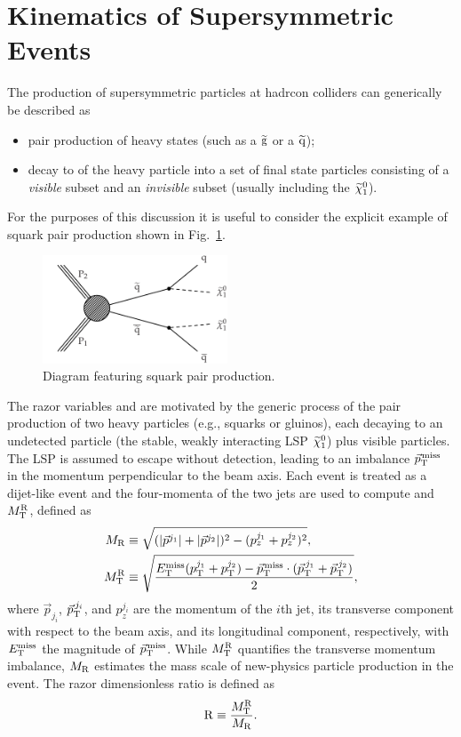 \section{Kinematics of Supersymmetric Events}
\label{sec:kinematic}

The production of supersymmetric particles at hadrcon colliders can generically be
described as
\begin{itemize}
\item pair production of heavy states (such as a $\mathrm{\widetilde{g}}$ or a $\mathrm{\widetilde{q}}$);
\item decay to of the heavy particle into a set of final state
  particles consisting of a \emph{visible} subset and an
  \emph{invisible} subset (usually including the $\widetilde{\chi}^{0}_1$).
\end{itemize}

For the purposes of this discussion it is useful to consider the
explicit example of squark pair production shown in Fig.~\ref{fig:T2}.
\begin{figure}[thb!]
\centering
\includegraphics[width=0.49\textwidth]{figs/theory/T2.pdf}
\caption{Diagram featuring squark pair production.\label{fig:T2}}
\end{figure}

The razor variables \MR and  \Rtwo are motivated by the generic process of the pair production of two
heavy particles (e.g., squarks or gluinos), each decaying to an
undetected particle (the stable, weakly interacting LSP $\widetilde{\chi}^{0}_1$)
plus visible particles. The LSP is assumed to escape without
detection, leading to an imbalance ${\vec p}_{\mathrm{T}}^{\kern1pt\text{miss}}$ in the momentum
perpendicular to the beam axis. Each event is treated as a dijet-like event
and the four-momenta of the two jets are used to compute \MR and $M_\mathrm{T}^\mathrm{R}$, defined as
\begin{align}
 \label{eq:MRstar}
 M_\mathrm{R} &\equiv
 \sqrt{
(\lvert \vec{p}^{j_{1}} \rvert+\lvert \vec{p}^{j_{2}} \rvert)^2 -({p}^{j_1}_z+{p}^{j_2}_z)^2},\\
M_\mathrm{T}^\mathrm{R} &\equiv \sqrt{ \frac{E_{\mathrm{T}}^{\text{miss}}(p_{\mathrm{T}}^{j_1}+p_{\mathrm{T}}^{j_2}) -
{\vec p}_{\mathrm{T}}^{\kern1pt\text{miss}} \cdot
 ({\vec p}_{\mathrm{T}}^{\,j_1}+{\vec p}_{\mathrm{T}}^{\,j_2}) }{2}},
\end{align}
where $\vec{p}_{j_i}$, ${\vec p}_{\mathrm{T}}^{\,j_i}$, and
$p^{j_i}_z$ are the momentum of the $i$th jet, its
transverse component with respect to the beam axis, and its
longitudinal component, respectively, with $E_{\mathrm{T}}^{\text{miss}}$ the magnitude of ${\vec p}_{\mathrm{T}}^{\kern1pt\text{miss}}$. While
$M_\mathrm{T}^\mathrm{R}$ quantifies the transverse momentum imbalance,
$M_\mathrm{R}$ estimates the mass scale of new-physics particle
production in the event. The razor dimensionless ratio is defined as
\begin{equation}
\mathrm{R} \equiv \frac{M_\mathrm{T}^\mathrm{R}}{M_\mathrm{R}}.
\end{equation}

